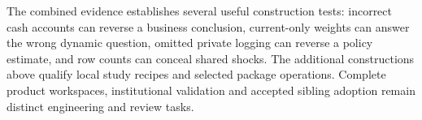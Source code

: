 The combined evidence establishes several useful construction tests:
incorrect cash accounts can reverse a business conclusion, current-only
weights can answer the wrong dynamic question, omitted private logging
can reverse a policy estimate, and row counts can conceal shared shocks.
The additional constructions above qualify local study recipes and selected
package operations. Complete product workspaces, institutional validation
and accepted sibling adoption remain distinct engineering and review tasks.




